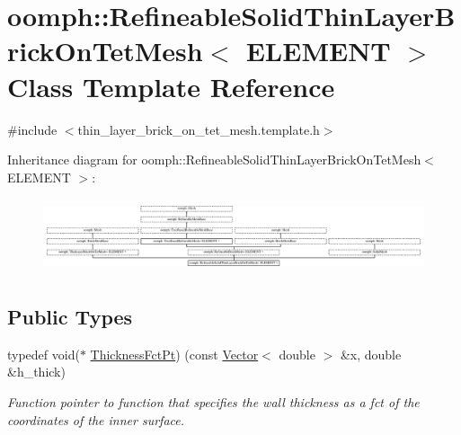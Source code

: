 \hypertarget{classoomph_1_1RefineableSolidThinLayerBrickOnTetMesh}{}\section{oomph\+:\+:Refineable\+Solid\+Thin\+Layer\+Brick\+On\+Tet\+Mesh$<$ E\+L\+E\+M\+E\+NT $>$ Class Template Reference}
\label{classoomph_1_1RefineableSolidThinLayerBrickOnTetMesh}


{\ttfamily \#include $<$thin\+\_\+layer\+\_\+brick\+\_\+on\+\_\+tet\+\_\+mesh.\+template.\+h$>$}

Inheritance diagram for oomph\+:\+:Refineable\+Solid\+Thin\+Layer\+Brick\+On\+Tet\+Mesh$<$ E\+L\+E\+M\+E\+NT $>$\+:\begin{figure}[H]
\begin{center}
\leavevmode
\includegraphics[height=2.187500cm]{classoomph_1_1RefineableSolidThinLayerBrickOnTetMesh}
\end{center}
\end{figure}
\subsection*{Public Types}
\begin{DoxyCompactItemize}
\item 
typedef void($\ast$ \hyperlink{classoomph_1_1RefineableSolidThinLayerBrickOnTetMesh_a45af8cb1926cec40d597eb18b75b96da}{Thickness\+Fct\+Pt}) (const \hyperlink{classoomph_1_1Vector}{Vector}$<$ double $>$ \&x, double \&h\+\_\+thick)
\begin{DoxyCompactList}\small\item\em Function pointer to function that specifies the wall thickness as a fct of the coordinates of the inner surface. \end{DoxyCompactList}\end{DoxyCompactItemize}
